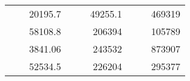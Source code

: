 \begin{table}[H]
\begin{tabular}{|ccrccrccc}
\rowcolor[HTML]{DDFDFF} 
\multicolumn{1}{|c|}{\cellcolor[HTML]{FFFFC7}}                                & \multicolumn{1}{c|}{\cellcolor[HTML]{DDFDFF}}                      & \multicolumn{1}{r|}{\cellcolor[HTML]{DAE8FC}20195.7}   & \multicolumn{1}{c|}{\cellcolor[HTML]{FFFFC7}}                                & \multicolumn{1}{c|}{\cellcolor[HTML]{DDFDFF}}                       & \multicolumn{1}{r|}{\cellcolor[HTML]{DDFDFF}49255.1}   & \multicolumn{1}{c|}{\cellcolor[HTML]{FFFFC7}}                                & \multicolumn{1}{c|}{\cellcolor[HTML]{DDFDFF}}                      & \multicolumn{1}{r|}{\cellcolor[HTML]{DDFDFF}469319}    \\ \cline{3-3} \cline{6-6} \cline{9-9} 
\multicolumn{1}{|c|}{\cellcolor[HTML]{FFFFC7}}                                & \multicolumn{1}{c|}{\cellcolor[HTML]{DDFDFF}}                      & \multicolumn{1}{r|}{\cellcolor[HTML]{DDFDFF}58108.8}   & \multicolumn{1}{c|}{\cellcolor[HTML]{FFFFC7}}                                & \multicolumn{1}{c|}{\cellcolor[HTML]{DDFDFF}}                       & \multicolumn{1}{r|}{\cellcolor[HTML]{DAE8FC}206394}    & \multicolumn{1}{c|}{\cellcolor[HTML]{FFFFC7}}                                & \multicolumn{1}{c|}{\cellcolor[HTML]{DDFDFF}}                      & \multicolumn{1}{r|}{\cellcolor[HTML]{DAE8FC}105789}    \\ \cline{3-3} \cline{6-6} \cline{9-9} 
\rowcolor[HTML]{DDFDFF} 
\multicolumn{1}{|c|}{\cellcolor[HTML]{FFFFC7}}                                & \multicolumn{1}{c|}{\cellcolor[HTML]{DDFDFF}}                      & \multicolumn{1}{r|}{\cellcolor[HTML]{DAE8FC}3841.06}   & \multicolumn{1}{c|}{\cellcolor[HTML]{FFFFC7}}                                & \multicolumn{1}{c|}{\cellcolor[HTML]{DDFDFF}}                       & \multicolumn{1}{r|}{\cellcolor[HTML]{DDFDFF}243532}    & \multicolumn{1}{c|}{\cellcolor[HTML]{FFFFC7}}                                & \multicolumn{1}{c|}{\cellcolor[HTML]{DDFDFF}}                      & \multicolumn{1}{r|}{\cellcolor[HTML]{DDFDFF}873907}    \\ \cline{3-3} \cline{6-6} \cline{9-9} 
\multicolumn{1}{|c|}{\cellcolor[HTML]{FFFFC7}}                                & \multicolumn{1}{c|}{\cellcolor[HTML]{DDFDFF}}                      & \multicolumn{1}{r|}{\cellcolor[HTML]{DDFDFF}52534.5}   & \multicolumn{1}{c|}{\cellcolor[HTML]{FFFFC7}}                                & \multicolumn{1}{c|}{\cellcolor[HTML]{DDFDFF}}                       & \multicolumn{1}{r|}{\cellcolor[HTML]{DAE8FC}226204}    & \multicolumn{1}{c|}{\cellcolor[HTML]{FFFFC7}}                                & \multicolumn{1}{c|}{\cellcolor[HTML]{DDFDFF}}                      & \multicolumn{1}{r|}{\cellcolor[HTML]{DAE8FC}295377}    \\ \cline{3-3} \cline{6-6} \cline{9-9} 

\end{tabular}
\end{table}
